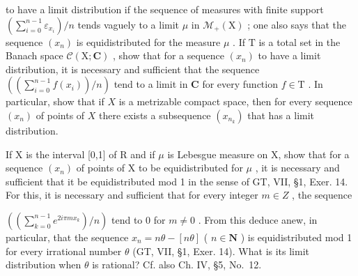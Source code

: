 to have a limit distribution if the sequence of measures with finite support \(\left(\sum_{i=0}^{n-1} \varepsilon_{x_i}\right)/n\) tends vaguely to a limit \(\mu\) in \(\mathcal{M}_{+}(\mathrm{X})\) ; one also says that the sequence \((x_{n})\) is equidistributed for the measure \(\mu\) . If \(\mathrm{T}\) is a total set in the Banach space \(\mathcal{C}(\mathrm{X};\mathbf{C})\) , show that for a sequence \((x_{n})\) to have a limit distribution, it is necessary and sufficient that the sequence \(\left(\left(\sum_{i=0}^{n-1} f(x_i)\right)/n\right)\) tend to a limit in \(\mathbf{C}\) for every function \(f \in \mathrm{T}\) . In particular, show that if \(X\) is a metrizable compact space, then for every sequence \((x_{n})\) of points of \(X\) there exists a subsequence \((x_{n_k})\) that has a limit distribution.

If X is the interval {[}0,1{]} of R and if \(\mu\) is Lebesgue measure on X, show that for a sequence \((x_{n})\) of points of X to be equidistributed for \(\mu\) , it is necessary and sufficient that it be equidistributed mod 1 in the sense of GT, VII, §1, Exer. 14. For this, it is necessary and sufficient that for every integer \(m \in Z\) , the sequence

\(\left(\left(\sum_{k=0}^{n-1} e^{2i\pi mx_k}\right)/n\right)\) tend to 0 for \(m \neq 0\) . From this deduce anew, in particular, that the sequence \(x_{n} = n\theta - [n\theta]\) ( \(n \in \mathbf{N}\) ) is equidistributed mod 1 for every irrational number \(\theta\) (GT, VII, §1, Exer. 14). What is its limit distribution when \(\theta\) is rational? Cf. also Ch. IV, §5, No.~12.

\setcounter{exercisegroup}{3}
\edef\CurrentExerciseGroup{\arabic{exercisegroup}}
